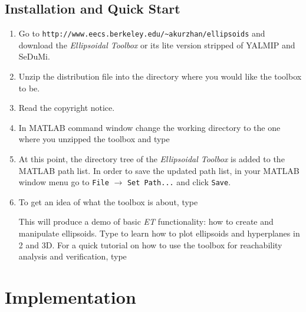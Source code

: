 \documentclass{report}
\begin{document}
\section{Installation and Quick Start}
\begin{enumerate}
\item Go to
\newline
{\tt http://www.eecs.berkeley.edu/\~{ }akurzhan/ellipsoids}
\newline
and download the {\it Ellipsoidal Toolbox} or its lite version stripped
of YALMIP and SeDuMi.
\item Unzip the distribution file into the directory where you would like
the toolbox to be.
\item Read the copyright notice.
\item In MATLAB command window change the working directory to the one where
you unzipped the toolbox and type
\newline
{}
\item At this point, the directory tree of the {\it Ellipsoidal Toolbox} is
added to the MATLAB path list. In order to save the updated path list,
in your MATLAB window menu go to {\tt File} $\rightarrow$ {\tt Set Path...} and
click {\tt Save}.
\item To get an idea of what the toolbox is about, type
\newline
{}

This will produce a demo of basic {\it ET} functionality: how to create
and manipulate ellipsoids.
\newline
Type
\newline
{}
to learn how to plot ellipsoids and hyperplanes in 2 and 3D.
\newline
For a quick tutorial on how to use the toolbox for reachability analysis
and verification, type
\newline
{}
\end{enumerate}





\chapter{Implementation}
\end{document}
